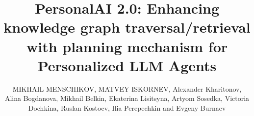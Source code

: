\documentclass{ieeeaccess}
\begin{document}

\title{PersonalAI 2.0: Enhancing knowledge graph traversal/retrieval with planning mechanism for Personalized LLM Agents}
\author{\uppercase{Mikhail Menschikov}, \uppercase{Matvey Iskornev}, Alexander Kharitonov, Alina Bogdanova, Mikhail Belkin, Ekaterina Lisitsyna, Artyom Sosedka, Victoria Dochkina, Ruslan Kostoev, Ilia Perepechkin and Evgeny Burnaev}

\address[1]{Skoltech, Moscow, Russia}
\address[2]{SberAI, Moscow, Russia}
\address[3]{Huawei, Moscow, Russia}
\address[4]{Sber, Moscow, Russia}
\address[5]{Public joint stock company "Sberbank of Russia" , Moscow, Russia}
\address[6]{AIRI, Moscow, Russia}



\end{document}
